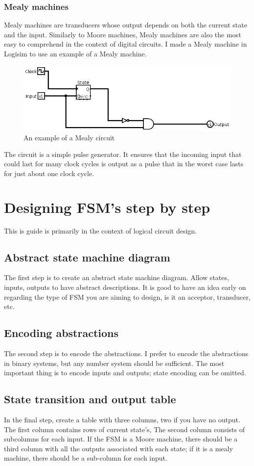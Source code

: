 \documentclass[a4paper,11pt]{article}
\begin{document}
\subsubsection*{Mealy machines}
Mealy machines are transducers whose output depends on both the current state and the input. Similarly to Moore machines, Mealy machines are also the most easy to comprehend in the context of digital circuits.  I made a Mealy machine in Logisim to use an example of a Mealy machine.

\begin{figure}[H]
    \centering
    \includegraphics[width=1\textwidth]{mealymachine.png}
    \caption{An example of a Mealy circuit}
    \label{fig:example_image}
\end{figure}

The circuit is a simple pulse generator. It ensures that the incoming input that could last for
many clock cycles is output as a pulse that in the worst case lasts for just about one clock cycle. 


\section*{Designing FSM's step by step}
This is guide is primarily in the context of logical circuit design. 

\subsection*{Abstract state machine diagram}
The first step is to create an abstract state machine diagram. Allow states, inputs, outputs to have abstract descriptions. It is good to have an idea early on regarding the type of FSM you are aiming to design, is it an acceptor, transducer, etc. 

\subsection*{Encoding abstractions}
The second step is to encode the abstractions. I prefer to encode the abstractions in binary systems, but any number system should be sufficient. The most important thing is to encode inputs and outputs; state encoding can be omitted. 

\subsection*{State transition and output table}
In the final step, create a table with three columns, two if you have no output. The first column contains rows of current state's, The second column consists of subcolumns for each input. If the FSM is a Moore machine, there should be a third column with all the outputs associated with each state; if it is a mealy machine, there should be a sub-column for each input. 
\end{document}
